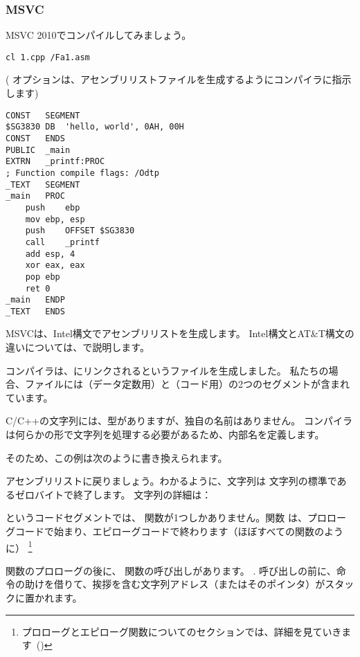 \subsubsection{MSVC}

MSVC 2010でコンパイルしてみましょう。

\begin{lstlisting}
cl 1.cpp /Fa1.asm
\end{lstlisting}

( オプションは、アセンブリリストファイルを生成するようにコンパイラに指示します)

\begin{lstlisting}[caption=MSVC 2010,style=customasmx86]
CONST	SEGMENT
$SG3830	DB	'hello, world', 0AH, 00H
CONST	ENDS
PUBLIC	_main
EXTRN	_printf:PROC
; Function compile flags: /Odtp
_TEXT	SEGMENT
_main	PROC
	push	ebp
	mov	ebp, esp
	push	OFFSET $SG3830
	call	_printf
	add	esp, 4
	xor	eax, eax
	pop	ebp
	ret	0
_main	ENDP
_TEXT	ENDS
\end{lstlisting}

MSVCは、Intel構文でアセンブリリストを生成します。 Intel構文とAT\&T構文の違いについては、で説明します。

コンパイラは、にリンクされるというファイルを生成しました。 
私たちの場合、ファイルには（データ定数用）と（コード用）の2つのセグメントが含まれています。

\label{string_is_const_char}
C/C++の文字列には、型がありますが、独自の名前はありません。
コンパイラは何らかの形で文字列を処理する必要があるため、内部名を定義します。

そのため、この例は次のように書き換えられます。



アセンブリリストに戻りましょう。わかるように、文字列は \CCpp 文字列の標準であるゼロバイトで終了します。 \CCpp 文字列の詳細は： 

というコードセグメントでは、\main{} 関数が1つしかありません。関数 \main は、プロローグコードで始まり、エピローグコードで終わります（ほぼすべての関数のように）
\footnote{プロローグとエピローグ関数についてのセクションでは、詳細を見ていきます~()}

関数のプロローグの後に、\printf{} 関数の呼び出しがあります。
.
呼び出しの前に、\PUSH 命令の助けを借りて、挨拶を含む文字列アドレス（またはそのポインタ）がスタックに置かれます。

